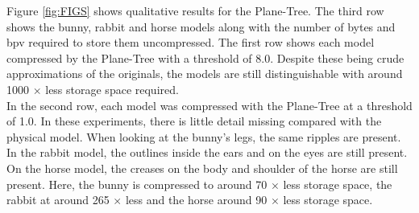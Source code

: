 
Figure \ref{fig:FIGS} shows qualitative results for the Plane-Tree. The third row shows the bunny, rabbit and horse models along with the number of bytes and bpv required to store them uncompressed. The first row shows each model compressed by the Plane-Tree with a threshold of 8.0. Despite these being crude approximations of the originals, the models are still distinguishable with around 1000 $\times$ less storage space required. \\

In the second row, each model was compressed with the Plane-Tree at a threshold of 1.0. In these experiments, there is little detail missing compared with the physical model. When looking at the bunny's legs, the same ripples are present. In the rabbit model, the outlines inside the ears and on the eyes are still present. On the horse model, the creases on the body and shoulder of the horse are still present. Here, the bunny is compressed to around 70 $\times$ less storage space, the rabbit at around 265 $\times$ less and the horse around 90 $\times$ less storage space. \\


